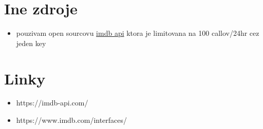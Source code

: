 \documentclass{article}
\begin{document}
\section{Ine zdroje}
\begin{itemize}
    \item pouzivam open sourcovu \href{https://imdb-api.com/}{imdb api} ktora je limitovana na 100 callov/24hr cez jeden key
\end{itemize}
\section{Linky}
\begin{itemize}
    \item https://imdb-api.com/
    \item https://www.imdb.com/interfaces/ 
    
\end{itemize}
\end{document}
